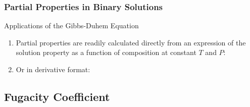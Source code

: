 \documentclass[10pt,compress,unknownkeysallowed]{beamer}
\begin{document}
\begin{frame}
  \frametitle{Partial Properties in Binary Solutions}
    \begin{block}{\begin{center}\normalsize{Applications of the Gibbs-Duhem Equation }\end{center}}
      \begin{enumerate}%
         \item<1->Partial properties are readily calculated directly from an expression of the solution property as a function of composition at constant $T$ and $P$:
         \item<2->Or in derivative format:
      \end{enumerate}
   \end{block}
\end{frame}
\normalsize




\subsection{Fugacity Coefficient}
\end{document}
